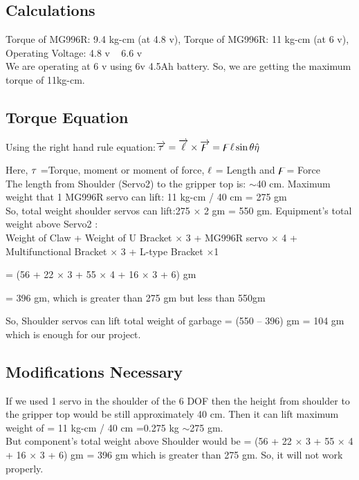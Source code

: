 \documentclass[conference]{IEEEtran}
\begin{document}
	
	\subsection{Calculations}
	
	Torque of MG996R: 9.4 kg-cm (at 4.8 v), Torque of MG996R: 11 kg-cm (at 6 v), Operating Voltage: 4.8 v ~ 6.6 v
	\\We are operating at 6 v using 6v 4.5Ah battery. So, we are getting the maximum torque of 11kg-cm.
	
	
	\subsection{Torque Equation}
	
	Using the right hand rule equation:$\overrightarrow{\rm \tau}=\overrightarrow{\rm \ell}\times\overrightarrow{\rm \digamma}=\digamma\ell\sin\theta\hat{\eta}$
	
	Here, $\rm \tau$ =Torque, moment or moment of force, $\rm \ell$ = Length and $\rm \digamma$= Force\\
	The length from Shoulder (Servo2) to the gripper top is: $\sim$40 cm. Maximum weight that 1 MG996R servo can lift: 11 kg-cm / 40 cm = 275 gm
	\\So, total weight shoulder servos can lift:275 $\times$ 2 gm = 550 gm. Equipment’s total weight above Servo2 : \\Weight of Claw + Weight of U Bracket $\times$ 3  + MG996R servo $\times$ 4 + Multifunctional Bracket $\times$ 3 + L-type Bracket $\times$1
	
	= (56 + 22 $\times$ 3 + 55 $\times$ 4 + 16 $\times$ 3 + 6) gm 
	
	= 396 gm, which is greater than 275 gm but less than 550gm
	
	So, Shoulder servos can lift total weight of garbage = (550 – 396) gm = 104 gm which is enough for our project. 
	
	\subsection{Modifications Necessary}
	
	If we used 1 servo in the shoulder of the 6 DOF then the height from shoulder to the gripper top would be still approximately 40 cm. 
	Then it can lift maximum weight of = 11 kg-cm / 40 cm =0.275 kg  $\sim$275 gm.\\
	But component’s total weight above Shoulder would be 
	= (56 + 22 $\times$ 3 + 55 $\times$ 4 + 16 $\times$ 3 + 6) gm 
	= 396 gm which is greater than 275 gm.
	So, it will not work properly.\\ 
	
\end{document}

